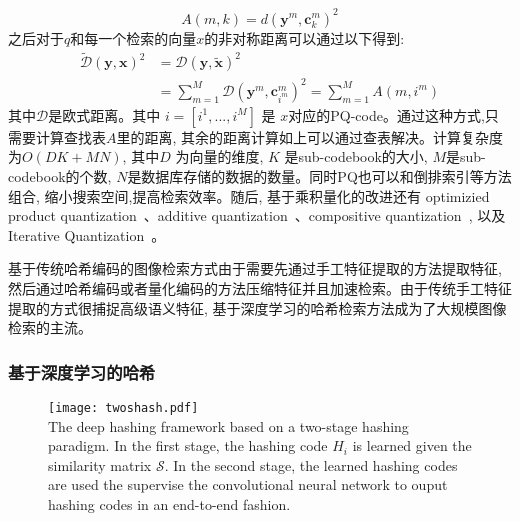 \begin{equation}
    A(m, k)=d\left(\mathbf{y}^m, \mathbf{c}_k^m\right)^2
\end{equation}
之后对于$q$和每一个检索的向量$x$的非对称距离可以通过以下得到:
\begin{equation}
    \begin{aligned}
        \tilde{\mathcal{D}}(\mathbf{y}, \mathbf{x})^2 & =\mathcal{D}(\mathbf{y}, \tilde{\mathbf{x}})^2 \\
        & =\sum_{m=1}^M \mathcal{D}\left(\mathbf{y}^m, \mathbf{c}_{i^m}^m\right)^2=\sum_{m=1}^M A\left(m, i^m\right)
    \end{aligned}
\end{equation}
其中$\mathcal{D}$是欧式距离。其中 $i = \left[i^1,...,i^M \right]$ 是 $x$对应的PQ-code。通过这种方式,只需要计算查找表$A$里的距离, 其余的距离计算如上可以通过查表解决。计算复杂度为$O(DK + MN)$, 其中$D$ 为向量的维度, $K$ 是sub-codebook的大小, $M$是sub-codebook的个数, $N$是数据库存储的数据的数量。同时PQ也可以和倒排索引等方法组合, 缩小搜索空间,提高检索效率。随后, 基于乘积量化的改进还有 optimizied product quantization~\cite{ge2013optimized}、additive quantization~\cite{martinez2016revisiting}、compositive quantization~\cite{zhang2014composite}, 以及 Iterative Quantization~\cite{gong2012iterative}。\par
基于传统哈希编码的图像检索方式由于需要先通过手工特征提取的方法提取特征,  然后通过哈希编码或者量化编码的方法压缩特征并且加速检索。由于传统手工特征提取的方式很捕捉高级语义特征, 基于深度学习的哈希检索方法成为了大规模图像检索的主流。

\subsubsection{基于深度学习的哈希}
\begin{figure}[!htp]
    \centering
    \texttt{[image: twoshash.pdf]} \\
      {The deep hashing framework based on a two-stage hashing paradigm. In the first stage, the hashing code $H_i$ is learned given the similarity matrix $\mathcal{S}$. In the second stage, the learned hashing codes are used the supervise the convolutional neural network to ouput hashing codes in an end-to-end fashion.  }
   \label{fig:twoshash}
\end{figure}

